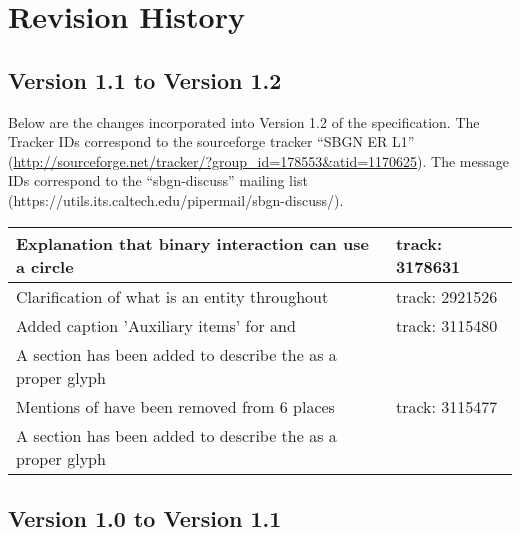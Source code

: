 \chapter{Revision History}

\section{Version 1.1 to Version 1.2}

Below are the changes incorporated into Version 1.2 of the \SBGNERLone specification. The Tracker IDs correspond to the sourceforge tracker ``SBGN ER L1'' (\url{http://sourceforge.net/tracker/?group_id=178553&atid=1170625}). The message IDs correspond to the ``sbgn-discuss'' mailing list (https://utils.its.caltech.edu/pipermail/sbgn-discuss/).

\begin{center}
\label{tab:revision history 1.2}
\tablelasttail{\hline}
\begin{supertabular}{|p{0.75\textwidth}|p{0.25\textwidth}|}\hline
Explanation that binary interaction can use a circle & track: 3178631 \\\hline
Clarification of what is an entity throughout & track: 2921526\\\hline
Added caption 'Auxiliary items' for  and  & track: 3115480\\\hline
A section has been added to describe the  as a proper glyph & \\\hline
Mentions of  have been removed from 6 places & track: 3115477\\\hline
A section has been added to describe the  as a proper glyph & \\\hline
\end{supertabular}
\end{center}


\section{Version 1.0 to Version 1.1}

